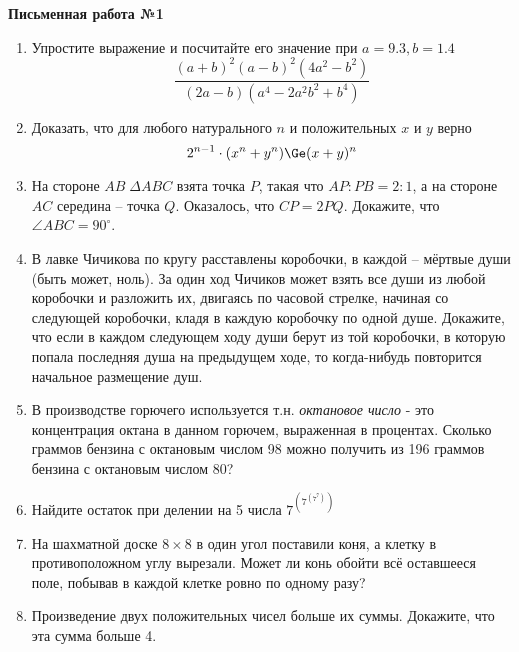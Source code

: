 \documentclass[12pt]{article}
\begin{document}
\centerline{\large \bf Письменная работа №1}
\begin{enumerate}
\item Упростите выражение и посчитайте его значение при $a = 9.3, b = 1.4$
\begin{equation*}
\frac{(a + b)^2(a - b)^2(4a^2 - b^2)}{(2a - b)(a^4 - 2a^2b^2 + b^4)}
\end{equation*}
\item Доказать, что для любого натурального $n$ и положительных $x$ и $y$ верно
\begin{equation*}
    2^{n - 1} \cdot (x^n + y^n) \Ge (x + y)^n
\end{equation*}
\item На стороне $AB \; \Delta ABC$ взята точка $P$, такая что $AP : PB = 2 : 1$, а на стороне $AC$
середина -- точка $Q$. Оказалось, что $CP = 2PQ$. Докажите, что $\angle ABC = 90^{\circ}$.


\item В лавке Чичикова по кругу расставлены коробочки, в каждой -- мёртвые души (быть может,
ноль). За один ход Чичиков может взять все души из любой коробочки и разложить их,
двигаясь по часовой стрелке, начиная со следующей коробочки, кладя в каждую коробочку по одной
душе. Докажите, что если в каждом следующем ходу души берут из той коробочки, в которую
попала последняя душа на предыдущем ходе, то когда-нибудь повторится начальное размещение
душ.
\item В производстве горючего используется т.н. {\it октановое число} - это концентрация октана в
данном горючем, выраженная в процентах. Сколько граммов бензина с октановым числом 98 можно получить
из 196 граммов бензина с октановым числом 80?
\item Найдите остаток при делении на 5 числа {\large $7^{\left(7^{(7^{7})}\right)}$}
\item На шахматной доске $8 \times 8$ в один угол поставили коня, а клетку в противоположном углу вырезали.
Может ли конь обойти всё оставшееся поле, побывав в каждой клетке ровно по одному разу?
\item Произведение двух положительных чисел больше их суммы. Докажите, что эта сумма больше 4.
\end{enumerate}
\end{document}
